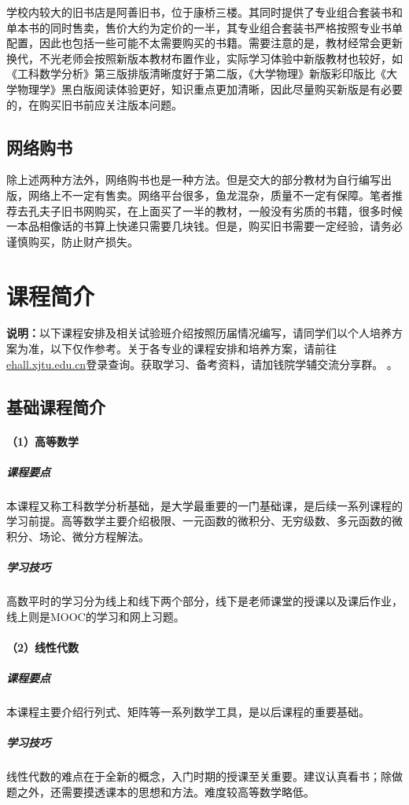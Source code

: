 \documentclass[
decoration,  %
]{qyxf-book}
\begin{document}
学校内较大的旧书店是阿善旧书，位于康桥三楼。其同时提供了专业组合套装书和单本书的同时售卖，售价大约为定价的一半，其专业组合套装书严格按照专业书单配置，因此也包括一些可能不太需要购买的书籍。需要注意的是，教材经常会更新换代，不光老师会按照新版本教材布置作业，实际学习体验中新版教材也较好，如《工科数学分析》第三版排版清晰度好于第二版，《大学物理》新版彩印版比《大学物理学》黑白版阅读体验更好，知识重点更加清晰，因此尽量购买新版是有必要的，在购买旧书前应关注版本问题。

\subsection{网络购书}
除上述两种方法外，网络购书也是一种方法。但是交大的部分教材为自行编写出版，网络上不一定有售卖。网络平台很多，鱼龙混杂，质量不一定有保障。笔者推荐去孔夫子旧书网购买，在上面买了一半的教材，一般没有劣质的书籍，很多时候一本品相像话的书算上快递只需要几块钱。但是，购买旧书需要一定经验，请务必谨慎购买，防止财产损失。

\section{课程简介}
\textbf{说明：}以下课程安排及相关试验班介绍按照历届情况编写，请同学们以个人培养方案为准，以下仅作参考。关于各专业的课程安排和培养方案，请前往\url{ehall.xjtu.edu.cn}登录查询。获取学习、备考资料，请加钱院学辅交流分享群。
。

\subsection{基础课程简介}
\paragraph{（1）高等数学}
\subparagraph{课程要点}
本课程又称工科数学分析基础，是大学最重要的一门基础课，是后续一系列课程的学习前提。高等数学主要介绍极限、一元函数的微积分、无穷级数、多元函数的微积分、场论、微分方程解法。

\subparagraph{学习技巧}
高数平时的学习分为线上和线下两个部分，线下是老师课堂的授课以及课后作业，线上则是MOOC的学习和网上习题。

\paragraph{（2）线性代数}
\subparagraph{课程要点}
本课程主要介绍行列式、矩阵等一系列数学工具，是以后课程的重要基础。

\subparagraph{学习技巧}
线性代数的难点在于全新的概念，入门时期的授课至关重要。建议认真看书；除做题之外，还需要摸透课本的思想和方法。难度较高等数学略低。
\end{document}
